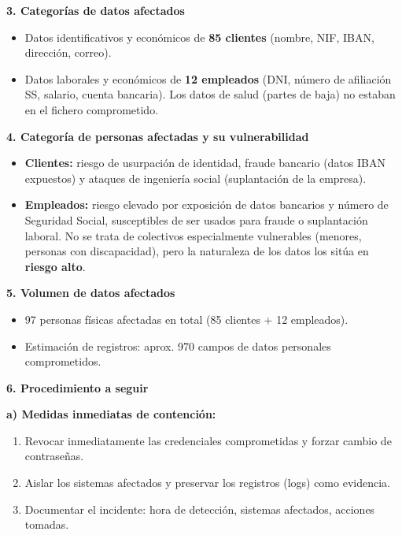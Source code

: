 \begin{solution}
	\medskip

	\textbf{3. Categorías de datos afectados}

	\begin{itemize}
		\item Datos identificativos y económicos de \textbf{85 clientes} (nombre, NIF, IBAN,
		      dirección, correo).
		\item Datos laborales y económicos de \textbf{12 empleados} (DNI, número de afiliación SS,
		      salario, cuenta bancaria). Los datos de salud (partes de baja) no estaban en el fichero
		      comprometido.
	\end{itemize}

	\medskip

\end{solution}
\clearpage
\begin{solution}
	\textbf{4. Categoría de personas afectadas y su vulnerabilidad}

	\begin{itemize}
		\item \textbf{Clientes:} riesgo de usurpación de identidad, fraude bancario (datos IBAN
		      expuestos) y ataques de ingeniería social (suplantación de la empresa).
		\item \textbf{Empleados:} riesgo elevado por exposición de datos bancarios y número de
		      Seguridad Social, susceptibles de ser usados para fraude o suplantación laboral.
		      No se trata de colectivos especialmente vulnerables (menores, personas con discapacidad),
		      pero la naturaleza de los datos los sitúa en \textbf{riesgo alto}.
	\end{itemize}

	\medskip

	\textbf{5. Volumen de datos afectados}

	\begin{itemize}
		\item 97 personas físicas afectadas en total (85 clientes + 12 empleados).
		\item Estimación de registros: aprox. 970 campos de datos personales comprometidos.
	\end{itemize}

	\medskip

	\textbf{6. Procedimiento a seguir}

	\textbf{a) Medidas inmediatas de contención:}
	\begin{enumerate}[label=\arabic*.]
		\item Revocar inmediatamente las credenciales comprometidas y forzar cambio de contraseñas.
		\item Aislar los sistemas afectados y preservar los registros (logs) como evidencia.
		\item Documentar el incidente: hora de detección, sistemas afectados, acciones tomadas.
	\end{enumerate}


\end{solution}
